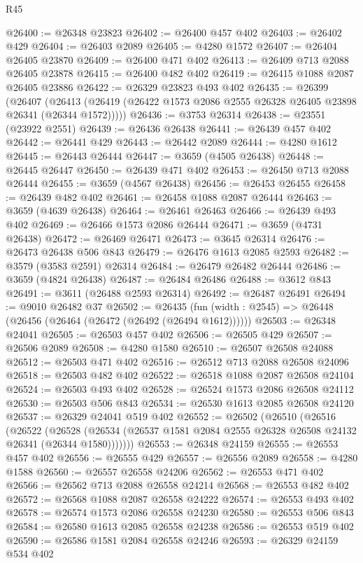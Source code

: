 \begin{lexlean}{R45}
\begin{coremodule}
@26400 := @26348 @23823
@26402 := @26400 @457 @402
@26403 := @26402 @429
@26404 := @26403 @2089
@26405 := @4280 @1572
@26407 := @26404 @26405 @23870
@26409 := @26400 @471 @402
@26413 := @26409 @713 @2088 @26405 @23878
@26415 := @26400 @482 @402
@26419 := @26415 @1088 @2087 @26405 @23886
@26422 := @26329 @23823 @493 @402
@26435 := @26399
    (@26407 (@26413 (@26419 (@26422 @1573 @2086 @2555 @26328 @26405 @23898 @26341 (@26344 @1572)))))
@26436 := @3753 @26314
@26438 := @23551 (@23922 @2551)
@26439 := @26436 @26438
@26441 := @26439 @457 @402
@26442 := @26441 @429
@26443 := @26442 @2089
@26444 := @4280 @1612
@26445 := @26443 @26444
@26447 := @3659 (@4505 @26438)
@26448 := @26445 @26447
@26450 := @26439 @471 @402
@26453 := @26450 @713 @2088 @26444
@26455 := @3659 (@4567 @26438)
@26456 := @26453 @26455
@26458 := @26439 @482 @402
@26461 := @26458 @1088 @2087 @26444
@26463 := @3659 (@4639 @26438)
@26464 := @26461 @26463
@26466 := @26439 @493 @402
@26469 := @26466 @1573 @2086 @26444
@26471 := @3659 (@4731 @26438)
@26472 := @26469 @26471
@26473 := @3645 @26314
@26476 := @26473 @26438 @506 @843
@26479 := @26476 @1613 @2085 @2593
@26482 := @3579 (@3583 @2591) @26314
@26484 := @26479 @26482 @26444
@26486 := @3659 (@4824 @26438)
@26487 := @26484 @26486
@26488 := @3612 @843
@26491 := @3611 (@26488 @2593 @26314)
@26492 := @26487 @26491
@26494 := @9010 @26482 @37
@26502 := @26435 (fun (width : @2545) => @26448 (@26456 (@26464 (@26472 (@26492 (@26494 @1612))))))
@26503 := @26348 @24041
@26505 := @26503 @457 @402
@26506 := @26505 @429
@26507 := @26506 @2089
@26508 := @4280 @1580
@26510 := @26507 @26508 @24088
@26512 := @26503 @471 @402
@26516 := @26512 @713 @2088 @26508 @24096
@26518 := @26503 @482 @402
@26522 := @26518 @1088 @2087 @26508 @24104
@26524 := @26503 @493 @402
@26528 := @26524 @1573 @2086 @26508 @24112
@26530 := @26503 @506 @843
@26534 := @26530 @1613 @2085 @26508 @24120
@26537 := @26329 @24041 @519 @402
@26552 := @26502
    (@26510
      (@26516
        (@26522
          (@26528 (@26534 (@26537 @1581 @2084 @2555 @26328 @26508 @24132 @26341 (@26344 @1580)))))))
@26553 := @26348 @24159
@26555 := @26553 @457 @402
@26556 := @26555 @429
@26557 := @26556 @2089
@26558 := @4280 @1588
@26560 := @26557 @26558 @24206
@26562 := @26553 @471 @402
@26566 := @26562 @713 @2088 @26558 @24214
@26568 := @26553 @482 @402
@26572 := @26568 @1088 @2087 @26558 @24222
@26574 := @26553 @493 @402
@26578 := @26574 @1573 @2086 @26558 @24230
@26580 := @26553 @506 @843
@26584 := @26580 @1613 @2085 @26558 @24238
@26586 := @26553 @519 @402
@26590 := @26586 @1581 @2084 @26558 @24246
@26593 := @26329 @24159 @534 @402

\end{coremodule}
\end{lexlean}
